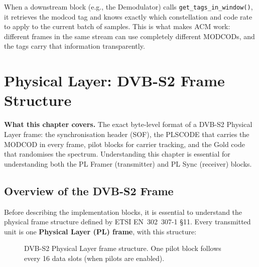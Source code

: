\documentclass[12pt,a4paper]{report}
\begin{document}
When a downstream block (e.g., the Demodulator) calls
\texttt{get\_tags\_in\_window()}, it retrieves the modcod tag and knows
exactly which constellation and code rate to apply to the current batch of
samples. This is what makes ACM work: different frames in the same stream
can use completely different MODCODs, and the tags carry that information
transparently.

\chapter{Physical Layer: DVB-S2 Frame Structure}

\begin{keyinsight}
\textbf{What this chapter covers.}
The exact byte-level format of a DVB-S2 Physical Layer frame: the synchronisation
header (SOF), the PLSCODE that carries the MODCOD in every frame, pilot blocks
for carrier tracking, and the Gold code that randomises the spectrum.
Understanding this chapter is essential for understanding both the PL Framer
(transmitter) and PL Sync (receiver) blocks.
\end{keyinsight}

\section{Overview of the DVB-S2 Frame}

Before describing the implementation blocks, it is essential to understand
the physical frame structure defined by ETSI EN~302~307-1 \S11. Every
transmitted unit is one \textbf{Physical Layer (PL) frame}, with this structure:

\begin{figure}[H]
\centering
{}
\caption{DVB-S2 Physical Layer frame structure. One pilot block follows
every 16 data slots (when pilots are enabled).}
\label{fig:pl_frame}
\end{figure}
\end{document}
